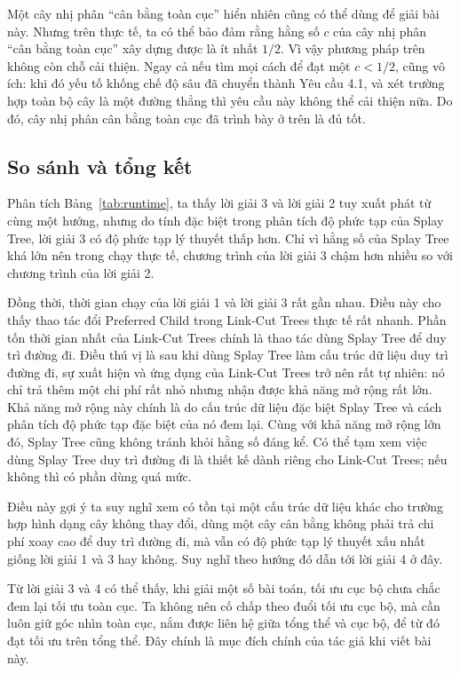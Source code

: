 \documentclass[11pt]{article}
\begin{document}
Một cây nhị phân ``cân bằng toàn cục'' hiển nhiên cũng có thể dùng để giải bài
này. Nhưng trên thực tế, ta có thể bảo đảm rằng hằng số $c$ của cây nhị phân
``cân bằng toàn cục'' xây dựng được là ít nhất $1/2$. Vì vậy phương pháp trên
không còn chỗ cải thiện. Ngay cả nếu tìm mọi cách để đạt một $c<1/2$, cũng vô
ích: khi đó yếu tố khống chế độ sâu đã chuyển thành Yêu cầu 4.1, và xét trường
hợp toàn bộ cây là một đường thẳng thì yêu cầu này không thể cải thiện nữa.
Do đó, cây nhị phân cân bằng toàn cục đã trình bày ở trên là đủ tốt.

\subsection{So sánh và tổng kết}

Phân tích Bảng~\ref{tab:runtime}, ta thấy lời giải 3 và lời giải 2 tuy xuất
phát từ cùng một hướng, nhưng do tính đặc biệt trong phân tích độ phức tạp của
Splay Tree, lời giải 3 có độ phức tạp lý thuyết thấp hơn. Chỉ vì hằng số của
Splay Tree khá lớn nên trong chạy thực tế, chương trình của lời giải 3 chậm
hơn nhiều so với chương trình của lời giải 2.

Đồng thời, thời gian chạy của lời giải 1 và lời giải 3 rất gần nhau. Điều này
cho thấy thao tác đổi Preferred Child trong Link-Cut Trees thực tế rất nhanh.
Phần tốn thời gian nhất của Link-Cut Trees chính là thao tác dùng Splay Tree để
duy trì đường đi. Điều thú vị là sau khi dùng Splay Tree làm cấu trúc dữ liệu
duy trì đường đi, sự xuất hiện và ứng dụng của Link-Cut Trees trở nên rất tự
nhiên: nó chỉ trả thêm một chi phí rất nhỏ nhưng nhận được khả năng mở rộng
rất lớn. Khả năng mở rộng này chính là do cấu trúc dữ liệu đặc biệt Splay Tree
và cách phân tích độ phức tạp đặc biệt của nó đem lại. Cùng với khả năng mở
rộng lớn đó, Splay Tree cũng không tránh khỏi hằng số đáng kể. Có thể tạm xem
việc dùng Splay Tree duy trì đường đi là thiết kế dành riêng cho Link-Cut Trees;
nếu không thì có phần dùng quá mức.

Điều này gợi ý ta suy nghĩ xem có tồn tại một cấu trúc dữ liệu khác cho trường
hợp hình dạng cây không thay đổi, dùng một cây cân bằng không phải trả chi phí
xoay cao để duy trì đường đi, mà vẫn có độ phức tạp lý thuyết xấu nhất giống
lời giải 1 và 3 hay không. Suy nghĩ theo hướng đó dẫn tới lời giải 4 ở đây.

Từ lời giải 3 và 4 có thể thấy, khi giải một số bài toán, tối ưu cục bộ chưa
chắc đem lại tối ưu toàn cục. Ta không nên cố chấp theo đuổi tối ưu cục bộ, mà
cần luôn giữ góc nhìn toàn cục, nắm được liên hệ giữa tổng thể và cục bộ, để
từ đó đạt tối ưu trên tổng thể. Đây chính là mục đích chính của tác giả khi
viết bài này.
\end{document}
